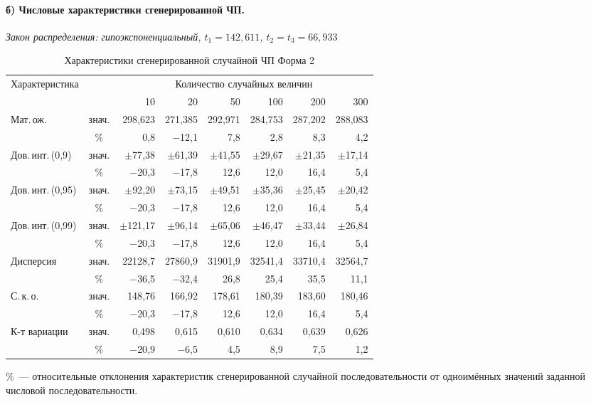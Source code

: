 \documentclass[a4paper,12pt]{article}
\begin{document}
\paragraph{б) Числовые характеристики сгенерированной ЧП.}
\begin{table}[H]
\caption{Характеристики сгенерированной случайной ЧП \hfill Форма 2}\label{tab:f2}
\centering\small
\textit{Закон распределения: гипоэкспоненциальный, $t_1=142{,}611$, $t_2=t_3=66{,}933$}\\[4pt]
\begin{tabular}{|l|c|r|r|r|r|r|r|}
\hline
\multirow{2}{*}{Характеристика} & & \multicolumn{6}{c|}{Количество случайных величин} \\ \cline{3-8}
 & & 10 & 20 & 50 & 100 & 200 & 300 \\ \hline
\multirow{2}{*}{Мат.\,ож.} & знач. & 298{,}623 & 271{,}385 & 292{,}971 & 284{,}753 & 287{,}202 & 288{,}083 \\
 & \% & 0{,}8 & \ensuremath{-}12{,}1 & 7{,}8 & 2{,}8 & 8{,}3 & 4{,}2 \\ \hline
\multirow{2}{*}{Дов.\,инт.\,(0,9)} & знач. & $\pm$77{,}38 & $\pm$61{,}39 & $\pm$41{,}55 & $\pm$29{,}67 & $\pm$21{,}35 & $\pm$17{,}14 \\
 & \% & \ensuremath{-}20{,}3 & \ensuremath{-}17{,}8 & 12{,}6 & 12{,}0 & 16{,}4 & 5{,}4 \\ \hline
\multirow{2}{*}{Дов.\,инт.\,(0,95)} & знач. & $\pm$92{,}20 & $\pm$73{,}15 & $\pm$49{,}51 & $\pm$35{,}36 & $\pm$25{,}45 & $\pm$20{,}42 \\
 & \% & \ensuremath{-}20{,}3 & \ensuremath{-}17{,}8 & 12{,}6 & 12{,}0 & 16{,}4 & 5{,}4 \\ \hline
\multirow{2}{*}{Дов.\,инт.\,(0,99)} & знач. & $\pm$121{,}17 & $\pm$96{,}14 & $\pm$65{,}06 & $\pm$46{,}47 & $\pm$33{,}44 & $\pm$26{,}84 \\
 & \% & \ensuremath{-}20{,}3 & \ensuremath{-}17{,}8 & 12{,}6 & 12{,}0 & 16{,}4 & 5{,}4 \\ \hline
\multirow{2}{*}{Дисперсия} & знач. & 22128{,}7 & 27860{,}9 & 31901{,}9 & 32541{,}4 & 33710{,}4 & 32564{,}7 \\
 & \% & \ensuremath{-}36{,}5 & \ensuremath{-}32{,}4 & 26{,}8 & 25{,}4 & 35{,}5 & 11{,}1 \\ \hline
\multirow{2}{*}{С.\,к.\,о.} & знач. & 148{,}76 & 166{,}92 & 178{,}61 & 180{,}39 & 183{,}60 & 180{,}46 \\
 & \% & \ensuremath{-}20{,}3 & \ensuremath{-}17{,}8 & 12{,}6 & 12{,}0 & 16{,}4 & 5{,}4 \\ \hline
\multirow{2}{*}{К-т вариации} & знач. & 0{,}498 & 0{,}615 & 0{,}610 & 0{,}634 & 0{,}639 & 0{,}626 \\
 & \% & \ensuremath{-}20{,}9 & \ensuremath{-}6{,}5 & 4{,}5 & 8{,}9 & 7{,}5 & 1{,}2 \\ \hline
\end{tabular}

\smallskip
\footnotesize \%~--- относительные отклонения характеристик сгенерированной случайной последовательности от одноимённых значений заданной числовой последовательности.
\end{table}
\end{document}
